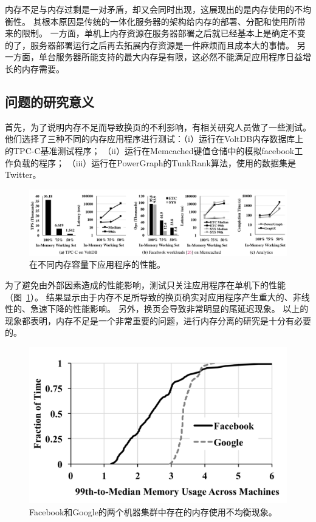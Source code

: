 内存不足与内存过剩是一对矛盾，却又会同时出现，这展现出的是内存使用的不均衡性。
其根本原因是传统的一体化服务器的架构给内存的部署、分配和使用所带来的限制。
一方面，单机上内存资源在服务器部署之后就已经基本上是确定不变的了，服务器部署运行之后再去拓展内存资源是一件麻烦而且成本大的事情。
另一方面，单台服务器所能支持的最大内存是有限，这必然不能满足应用程序日益增长的内存需要。

\subsection{问题的研究意义}
首先，为了说明内存不足而导致换页的不利影响，有相关研究人员做了一些测试。
他们选择了三种不同的内存应用程序进行测试：（i）运行在VoltDB内存数据库上的TPC-C基准测试程序；
（ii）运行在Memcached键值仓储中的模拟facebook工作负载的程序；
（iii）运行在PowerGraph的TunkRank算法，使用的数据集是Twitter。

\begin{figure}
\centering
\includegraphics[scale=0.45]{Figures/memory/memory_motivation1.png}
\decoRule
\caption{在不同内存容量下应用程序的性能。}
\label{fig:memory_motivation1}
\end{figure}

为了避免由外部因素造成的性能影响，测试只关注应用程序在单机下的性能（图~\ref{fig:memory_motivation1}）。
结果显示由于内存不足所导致的换页确实对应用程序产生重大的、非线性的、急速下降的性能影响。
另外，换页会导致非常明显的尾延迟现象。
以上的现象都表明，内存不足是一个非常重要的问题，进行内存分离的研究是十分有必要的。

\begin{figure}
\centering
\includegraphics[scale=0.6]{Figures/memory/memory_motivation2.png}
\decoRule
\caption{Facebook和Google的两个机器集群中存在的内存使用不均衡现象。}
\label{fig:memory_motivation2}
\end{figure}

